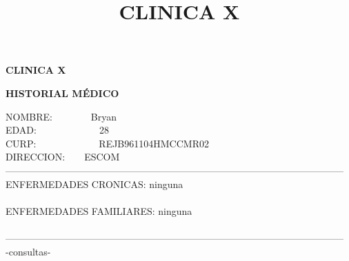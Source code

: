 \documentclass[10pt,a4paper]{letter}
\title{\bf CLINICA X}
\begin{document}
\begin{center}
{\scshape\LARGE \bf CLINICA X\par}
{\bf HISTORIAL MÉDICO\\}
\end{center}
NOMBRE:\ \ \ \ \ \ \ \ Bryan\\
EDAD:\ \ \ \ \ \ \ \ \ \ \ \ \ 28\\
CURP:\ \ \ \ \ \ \ \ \ \ \ \ \ REJB961104HMCCMR02 \\
DIRECCION:\ \ \ \ ESCOM\\
--------------------------------------------------------------------------------------------------------- \\
ENFERMEDADES CRONICAS: ninguna\\ \\
ENFERMEDADES FAMILIARES: ninguna \\ \\
--------------------------------------------------------------------------------------------------------- \\
-consultas-
\end{document}
